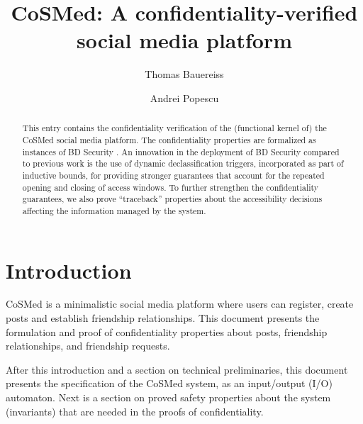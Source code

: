 \documentclass[11pt,a4paper]{article}
\begin{document}
\title{CoSMed: A confidentiality-verified social media platform}
\author{Thomas Bauereiss \and Andrei Popescu}
\maketitle

\begin{abstract}
	This entry contains the confidentiality verification of the (functional kernel of) the CoSMed  social media platform.
	The confidentiality properties are formalized as instances of BD Security
	\cite{BDsecurity-ITP2021,BDSecurity-AFP}.  An innovation in the deployment of BD Security compared to previous work is the use of dynamic declassification triggers, incorporated as part of inductive bounds, for providing stronger guarantees that account for the repeated opening and closing of access windows.
	To further strengthen the confidentiality guarantees,
	we also prove ``traceback'' properties about the accessibility decisions affecting the information managed by the system.
\end{abstract}

\tableofcontents


\section{Introduction}

CoSMed  \cite{cosmed-itp2016,cosmed-jar2018} is a
minimalistic social media platform where users can register,
create posts and establish friendship relationships. This document presents the
formulation and proof of confidentiality properties about posts, friendship relationships,
and friendship requests.

After this introduction and a section on technical preliminaries, this document presents the specification of the CoSMed system, as an input/output (I/O) automaton.
Next is a section on proved safety properties about the system (invariants) that are needed in the proofs of confidentiality.
\end{document}
